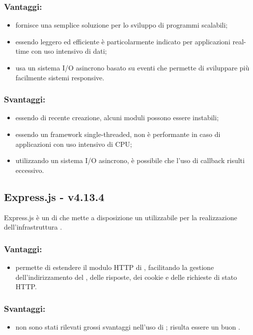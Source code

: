 \documentclass[a4paper, titlepage]{article}
\begin{document}
\subsubsection{Vantaggi:}
\begin{itemize}
	\item fornisce una semplice soluzione per lo sviluppo di programmi scalabili;
	\item essendo leggero ed efficiente è particolarmente indicato per applicazioni real-time con uso intensivo di dati;
	\item usa un sistema I/O asincrono basato su eventi che permette di sviluppare più facilmente sistemi responsive.
\end{itemize}

\subsubsection{Svantaggi:}
\begin{itemize}
	\item essendo di recente creazione, alcuni moduli possono essere instabili;
	\item essendo un framework single-threaded, non è performante in caso di applicazioni con uso
	intensivo di CPU;
	\item utilizzando un sistema I/O asincrono, è possibile che l’uso di callback risulti eccessivo.
\end{itemize}

\subsection{Express.js - v4.13.4}
Express.js è un  di  che mette a disposizione un  utilizzabile per la realizzazione dell’infrastruttura .

\subsubsection{Vantaggi:}
\begin{itemize}
	\item permette di estendere il modulo HTTP di , facilitando la gestione dell’indirizzamento del , delle risposte, dei cookie e delle richieste di stato HTTP.
\end{itemize}

\subsubsection{Svantaggi:}
\begin{itemize}
	\item non sono stati rilevati grossi svantaggi nell'uso di ; risulta essere un buon .
\end{itemize}
\end{document}
